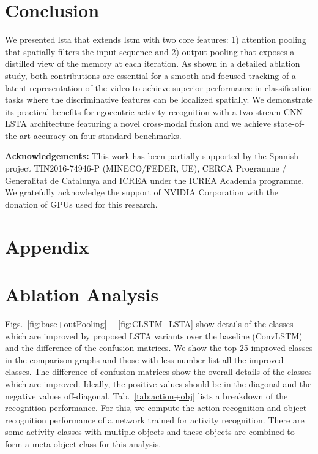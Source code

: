 \documentclass[10pt,twocolumn,letterpaper]{article}
\begin{document}
\begin{matrix*}[r]
\section{Conclusion}
\label{sec:conclusion}


We presented \ac{lsta} that extends \ac{lstm} with two core features: 1) attention pooling that spatially filters the input sequence and 2) output pooling that exposes a distilled view of the memory at each iteration. As shown in a detailed ablation study, both contributions are essential for a smooth and focused tracking of a latent representation of the video to achieve superior performance in classification tasks where the discriminative features can be localized spatially. We demonstrate its practical benefits for egocentric activity recognition with a two stream CNN-LSTA architecture featuring a novel cross-modal fusion and we achieve state-of-the-art accuracy on four standard benchmarks. \vskip 1.5mm



{\setlength{\parindent}{0cm}\small{\textbf{Acknowledgements:}
This work has been partially supported by the Spanish project TIN2016-74946-P (MINECO/FEDER, UE), CERCA Programme / Generalitat de Catalunya and ICREA under the ICREA Academia programme. We gratefully acknowledge the support of NVIDIA Corporation with the donation of GPUs used for this research.}}

{\small


}

\section*{Appendix}




	\section{Ablation Analysis}
	Figs.~\ref{fig:base+outPooling}~-~\ref{fig:CLSTM_LSTA} show details of the classes which are improved by proposed LSTA variants over the baseline (ConvLSTM) and the difference of the confusion matrices. We show the top 25 improved classes in the comparison graphs and those with less number list all the improved classes. The difference of confusion matrices show the overall details of the classes which are improved. Ideally, the positive values should be in the diagonal and the negative values off-diagonal. Tab.~\ref{tab:action+obj} lists a breakdown of the recognition performance. For this, we compute the action recognition and object recognition performance of a network trained for activity recognition. There are some activity classes with multiple objects and these objects are combined to form a meta-object class for this analysis.



\end{matrix*}
\end{document}
